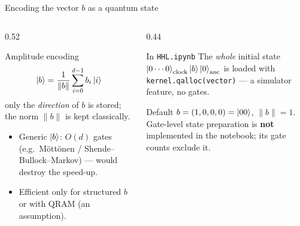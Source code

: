 \documentclass[aspectratio=169,11pt]{beamer}
\newcommand{\hl}[1]{{\color{qorange}\textbf{#1}}}
\begin{document}
\begin{frame}{Encoding the vector $b$ as a quantum state}
  \begin{columns}[T]
    \begin{column}{0.52\textwidth}
      \begin{block}{Amplitude encoding}
        \[ \ket b = \frac{1}{\|b\|}\sum_{i=0}^{d-1}b_i\ket i \]
        only the \emph{direction} of $b$ is stored; the norm $\|b\|$ is kept classically.
      \end{block}
      \small
      \begin{itemize}
        \item Generic $\ket b$: $O(d)$ gates (e.g.\ Möttönen / Shende--Bullock--Markov) --- would destroy the speed-up.
        \item Efficient only for structured $b$ or with QRAM (an assumption).
      \end{itemize}
    \end{column}
    \begin{column}{0.44\textwidth}
      \begin{block}{In \texttt{HHL.ipynb}}
        The \emph{whole} initial state $\ket{0\cdots0}_{\text{clock}}\ket b\ket0_{\text{anc}}$ is loaded with
        \texttt{kernel.qalloc(vector)} --- a simulator feature, no gates.
      \end{block}
      \small Default $b = (1, 0, 0, 0) = \ket{00}$, $\|b\| = 1$.\\[1mm]
      Gate-level state preparation is \hl{not} implemented in the notebook; its gate counts exclude it.
    \end{column}
  \end{columns}
\end{frame}
\end{document}
